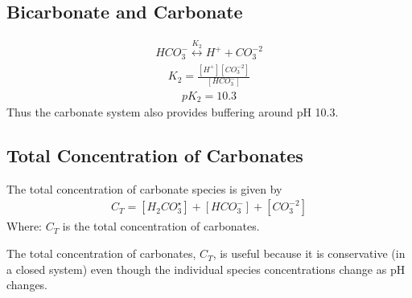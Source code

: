 \documentclass[letterpaper,10pt,english]{sphinxmanual}
\begin{document}
\subsection{Bicarbonate and Carbonate}
\label{\detokenize{Rapid_Mix/RM_Derivations:bicarbonate-and-carbonate}}\label{\detokenize{Rapid_Mix/RM_Derivations:heading-bicarbonate-and-carbonate}}\begin{equation}\label{equation:Rapid_Mix/RM_Derivations:Rapid_Mix/RM_Derivations:2}
\begin{split}HCO_3^ - \overset {{K_2}} \longleftrightarrow {H^ + } + CO_3^{ - 2}\end{split}
\end{equation}\begin{equation}\label{equation:Rapid_Mix/RM_Derivations:Rapid_Mix/RM_Derivations:3}
\begin{split}{K_2} = \frac{{\left[ {{H^ + }} \right]\left[ {CO_3^{ - 2}} \right]}}{{\left[ {HCO_3^ - } \right]}}\end{split}
\end{equation}\begin{equation}\label{equation:Rapid_Mix/RM_Derivations:Rapid_Mix/RM_Derivations:4}
\begin{split}p{K_2} = 10.3\end{split}
\end{equation}
Thus the carbonate system also provides buffering around pH 10.3.


\subsection{Total Concentration of Carbonates}
\label{\detokenize{Rapid_Mix/RM_Derivations:total-concentration-of-carbonates}}\label{\detokenize{Rapid_Mix/RM_Derivations:heading-total-concentration-of-carbonates}}
The total concentration of carbonate species is given by
\begin{equation}\label{equation:Rapid_Mix/RM_Derivations:Rapid_Mix/RM_Derivations:5}
\begin{split}{C_T} = \left[ {{H_2}CO_3^{\star} } \right] + \left[ {HCO_3^ - } \right] + \left[ {CO_3^{ - 2}} \right]\end{split}
\end{equation}
Where: \({C_T}\) is the total concentration of carbonates.

The total concentration of carbonates, \({C_T}\), is useful because it is conservative (in a closed system) even though the individual species concentrations change as pH changes.
\end{document}
